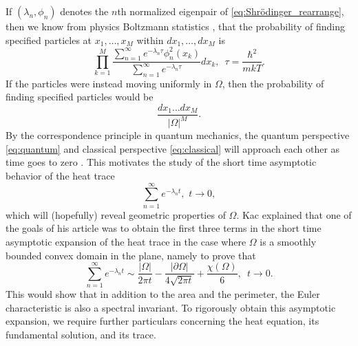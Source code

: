\documentclass{amsart}
\theoremstyle{definition}
\begin{document}
If $(\lambda_n,\phi_n)$ denotes the $n$th normalized eigenpair of \eqref{eq:Shrödinger_rearrange}, then we know from physics Boltzmann statistics \cite[ch. 6]{schroeder1999introduction}, \cite[ch. 6]{henningson2013borja} that the probability of finding specified particles at $x_1,\dots,x_M$ within $dx_1,\dots,dx_M$ is 
\begin{equation} \label{eq:quantum}
    \prod_{k = 1}^M \frac{\sum_{n = 1}^{\infty}e^{-\lambda_n\tau}\phi_n^2(x_k)}{\sum_{n = 1}^{\infty}e^{-\lambda_n\tau}}dx_k, \,\,\, \tau = \frac{\hbar^2}{mkT}.
\end{equation}
If the particles were instead moving uniformly in $\Omega$, then the probability of finding specified particles would be
\begin{equation} \label{eq:classical}
    \frac{dx_1\dots dx_M}{|\Omega|^M}.
\end{equation}  
By the correspondence principle in quantum mechanics, the quantum perspective \eqref{eq:quantum} and classical perspective \eqref{eq:classical} will approach each other as time goes to zero \cite[p. 160-161] {tipler2007modern}. This motivates the study of the short time asymptotic behavior of the heat trace
\begin{equation*}
    \sum_{n = 1}^\infty e^{-\lambda_n t}, \,\, t \to 0,
\end{equation*}
which will (hopefully) reveal geometric properties of $\Omega$.  Kac explained that one of the goals of his article was to obtain the first three terms in the short time asymptotic expansion of the heat trace in the case where $\Omega$ is a smoothly bounded convex domain in the plane, namely to prove that 
\begin{equation} \label{eq:heattrace_threeterms}
    \sum_{n = 1}^\infty e^{-\lambda_n t} \sim \frac{|\Omega|}{2\pi t} - \frac{|\partial \Omega|}{4\sqrt{2\pi t}} + \frac{\chi(\Omega)}{6}, \,\,\, t \to 0.
\end{equation}
This would show that in addition to the area and the perimeter, the Euler characteristic is also a spectral invariant.  To rigorously obtain this asymptotic expansion, we require further particulars concerning the heat equation, its fundamental solution, and its trace. 
\end{document}

